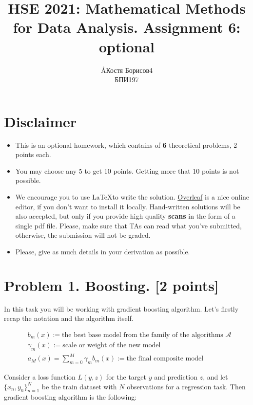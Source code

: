 \documentclass{article}
\title{HSE 2021: Mathematical Methods for Data Analysis. Assignment 6: optional}
\author{\AA{Костя Борисов}{4} \\ БПИ197}
\begin{document}
\maketitle

\section*{Disclaimer}
\begin{itemize}
    \item This is an optional homework, which contains of \textbf{6} theoretical problems, 2 points each.
    \item You may choose any 5 to get 10 points. Getting more that 10 points is not possible.
    \item We encourage you to use \LaTeX to write the solution. \href{https://www.overleaf.com/}{Overleaf} is a nice online editor, if you don't want to install it locally. Hand-written solutions will be also accepted, but only if you provide high quality \textbf{scans} in the form of a single pdf file. Please, make sure that TAs can read what you've submitted, otherwise, the submission will not be graded.
    \item Please, give as much details in your derivation as possible.
\end{itemize}

\newpage
\section*{Problem 1. Boosting. [2 points]}

In this task you will be working with gradient boosting algorithm. Let's firstly recap the notation and the algorithm itself.

\begin{align}
    & b_m(x) := \text{the best base model from the family of the algorithms $\mathcal{A}$} \\
    & \gamma_m(x) := \text{scale or weight of the new model} \\
    & a_M(x) = \sum_{m=0}^M \gamma_m b_m(x) := \text{the final composite model}
\end{align}


Consider a loss function $L(y, z)$ for the target $y$ and prediction $z$, and let
$\{x_n, y_n\}_{n=1}^N$ be the train dataset with $N$ observations for a regression task. Then gradient boosting algorithm is the following:
\end{document}
